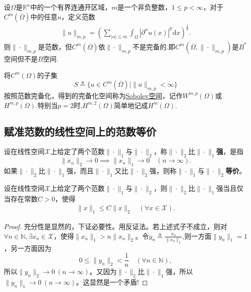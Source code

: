 \documentclass[../../main.tex]{subfiles}%
\begin{document}
\begin{proposition}
设$\Omega$是$\mathbb{R}^n$中的一个有界连通开区域，$m$是一个非负整数，$1 \leqslant p < \infty$，对于$C^m(\overline{\Omega})$中的任意$u$，定义范数
\begin{align*}
\|u\|_{m,p} = \left( \sum\limits_{|\alpha|\leqslant m} \int_\Omega |\partial^\alpha u(x)|^p \mathrm{d}x \right)^{\frac{1}{p}}.
\end{align*}
则$\|\cdot\|_{m,p}$是范数，但$C^m(\overline{\Omega})$依$\|\cdot\|_{m,p}$不是完备的.即$C^m(\overline{\Omega},\|\cdot\|_{m,p})$是$B^*$空间但不是$B$空间.

将$C^m(\Omega)$的子集
$$S \triangleq \{u \in C^m(\overline{\Omega}) \mid \|u\|_{m,p} < \infty\}$$
按照范数完备化，得到的完备化空间称为\hyperref[definition:Sobolev空间]{Sobolev空间}，记作$W^{m,p}(\Omega)$或$H^{m,p}(\Omega)$.特别当$p=2$时,$H^{m,2}(\Omega)$简单地记成$H^{m}(\Omega)$.
\end{proposition}


\subsection{赋准范数的线性空间上的范数等价}

\begin{definition}
设在线性空间$\mathscr{X}$上给定了两个范数$\|\cdot\|_1$与$\|\cdot\|_2$，称$\|\cdot\|_2$比$\|\cdot\|_1$\textbf{强}，是指
$$\|x_n\|_2 \to 0 \implies \|x_n\|_1 \to 0 \quad (n \to \infty).$$
如果$\|\cdot\|_2$比$\|\cdot\|_1$强，而且$\|\cdot\|_1$又比$\|\cdot\|_2$强，则称$\|\cdot\|_1$与$\|\cdot\|_2$\textbf{等价}。
\end{definition}

\begin{proposition}\label{proposition:范数强的充要条件}
设在线性空间$\mathscr{X}$上给定了两个范数$\|\cdot\|_1$与$\|\cdot\|_2$，则$\|\cdot\|_2$比$\|\cdot\|_1$强当且仅当存在常数$C>0$，使得
\begin{align*}
\|x\|_1 \leqslant C\|x\|_2 \quad (\forall x \in \mathscr{X}).
\end{align*}
\end{proposition}
\begin{proof}

充分性是显然的，下证必要性。用反证法。若上述式子不成立，则对$\forall n \in \mathbb{N}, \exists x_n \in \mathscr{X}$，使得$\|x_n\|_1 > n\|x_n\|_2$。令$y_n\triangleq \frac{x_n}{\parallel x_n\parallel _1}$,则一方面$\|y_n\|_1=1$，另一方面因为
$$0 \leqslant \|y_n\|_2 < \frac{1}{n} \quad (\forall n \in \mathbb{N}),$$
所以$\|y_n\|_2 \to 0 \ (n \to \infty)$。又因为$\|\cdot\|_2$比$\|\cdot\|_1$强，所以$\|y_n\|_1 \to 0 \ (n \to \infty)$。这显然是一个矛盾!

\end{proof}
\end{document}
